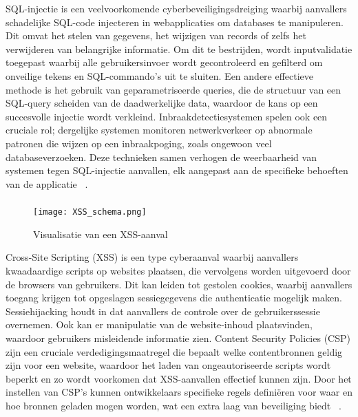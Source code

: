 SQL-injectie is een veelvoorkomende cyberbeveiligingsdreiging waarbij aanvallers schadelijke SQL-code injecteren in webapplicaties om databases te manipuleren. 
Dit omvat het stelen van gegevens, het wijzigen van records of zelfs het verwijderen van belangrijke informatie. Om dit te bestrijden, wordt inputvalidatie 
toegepast waarbij alle gebruikersinvoer wordt gecontroleerd en gefilterd om onveilige tekens en SQL-commando's uit te sluiten. Een andere effectieve methode 
is het gebruik van geparametriseerde queries, die de structuur van een SQL-query scheiden van de daadwerkelijke data, waardoor de kans op een succesvolle 
injectie wordt verkleind. Inbraakdetectiesystemen spelen ook een cruciale rol; dergelijke systemen monitoren netwerkverkeer op abnormale patronen die wijzen op 
een inbraakpoging, zoals ongewoon veel databaseverzoeken. Deze technieken samen verhogen de weerbaarheid van systemen tegen SQL-injectie aanvallen, elk 
aangepast aan de specifieke behoeften van de applicatie ~\autocite{Abdullayev2023}.

\subsubsection{}
\label{sec:Cross-Site Scripting (XSS)}
\begin{figure}
    \centering
    \texttt{[image: XSS\_schema.png]}
    \caption[Visualisatie van een XSS-aanval]{Visualisatie van een XSS-aanval}
\end{figure}

Cross-Site Scripting (XSS) is een type cyberaanval waarbij aanvallers kwaadaardige scripts op websites plaatsen, die vervolgens worden uitgevoerd door de 
browsers van gebruikers. Dit kan leiden tot gestolen cookies, waarbij aanvallers toegang krijgen tot opgeslagen sessiegegevens die authenticatie mogelijk 
maken. Sessiehijacking houdt in dat aanvallers de controle over de gebruikerssessie overnemen. Ook kan er manipulatie van de website-inhoud plaatsvinden, 
waardoor gebruikers misleidende informatie zien. Content Security Policies (CSP) zijn een cruciale verdedigingsmaatregel die bepaalt welke contentbronnen 
geldig zijn voor een website, waardoor het laden van ongeautoriseerde scripts wordt beperkt en zo wordt voorkomen dat XSS-aanvallen effectief kunnen zijn. 
Door het instellen van CSP's kunnen ontwikkelaars specifieke regels definiëren voor waar en hoe bronnen geladen mogen worden, wat een extra laag van beveiliging
biedt ~\autocite{Weamie2022}.

